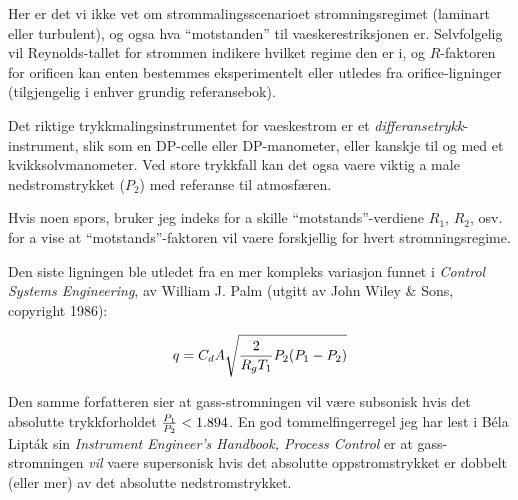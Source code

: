 





Her er det vi ikke vet om strommalingsscenarioet stromningsregimet (laminart eller turbulent), og ogsa hva ``motstanden'' til vaeskerestriksjonen er.  Selvfolgelig vil Reynolds-tallet for strommen indikere hvilket regime den er i, og $R$-faktoren for orificen kan enten bestemmes eksperimentelt eller utledes fra orifice-ligninger (tilgjengelig i enhver grundig referansebok).

\vskip 10pt

Det riktige trykkmalingsinstrumentet for vaeskestrom er et {\it differansetrykk}-instrument, slik som en DP-celle eller DP-manometer, eller kanskje til og med et kvikksolvmanometer.  Ved store trykkfall kan det ogsa vaere viktig a male nedstromstrykket ($P_2$) med referanse til atmosfæren.







Hvis noen spors, bruker jeg indeks for a skille ``motstands''-verdiene $R_1$, $R_2$, osv. for a vise at ``motstands''-faktoren vil vaere forskjellig for hvert stromningsregime.

\vskip 10pt

Den siste ligningen ble utledet fra en mer kompleks variasjon funnet i {\it Control Systems Engineering}, av William J. Palm (utgitt av John Wiley \& Sons, copyright 1986):

$$q = C_d A \sqrt{{ 2 \over {R_g T_1}} P_2(P_1 - P_2)}$$

Den samme forfatteren sier at gass-stromningen vil være subsonisk hvis det absolutte trykkforholdet ${P_1 \over P_2} < 1.894$.  En god tommelfingerregel jeg har lest i B\'ela Lipt\'ak sin {\it Instrument Engineer's Handbook, Process Control} er at gass-stromningen {\it vil} vaere supersonisk hvis det absolutte oppstromstrykket er dobbelt (eller mer) av det absolutte nedstromstrykket.





